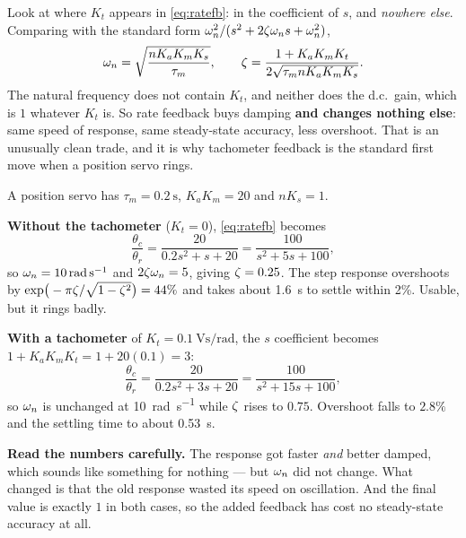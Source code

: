 \documentclass[11pt,a4paper]{article}
\begin{document}
\begin{keyidea}
Look at where $K_{t}$ appears in \eqref{eq:ratefb}: in the coefficient of $s$,
and \emph{nowhere else}. Comparing with the standard form
$\omega_{n}^{2}/(s^{2}+2\zeta\omega_{n} s+\omega_{n}^{2})$,
\[
  \omega_{n}=\sqrt{\frac{nK_{a}K_{m}K_{s}}{\tau_{m}}},
  \qquad
  \zeta=\frac{1+K_{a}K_{m}K_{t}}{2\sqrt{\tau_{m}nK_{a}K_{m}K_{s}}} .
\]
The natural frequency does not contain $K_{t}$, and neither does the d.c.\
gain, which is $1$ whatever $K_{t}$ is. So rate feedback buys damping
\textbf{and changes nothing else}: same speed of response, same steady-state
accuracy, less overshoot. That is an unusually clean trade, and it is why
tachometer feedback is the standard first move when a position servo rings.
\end{keyidea}

\begin{workedex}[breakable, title={Worked example 3.1 --- what rate feedback buys}]
A position servo has $\tau_{m}=\SI{0.2}{\second}$, $K_{a}K_{m}=20$ and
$nK_{s}=1$.

\smallskip
\textbf{Without the tachometer} ($K_{t}=0$), \eqref{eq:ratefb} becomes
\[
  \frac{\theta_{c}}{\theta_{r}}=\frac{20}{0.2s^{2}+s+20}
   =\frac{100}{s^{2}+5s+100},
\]
so $\omega_{n}=\SI{10}{\radian\per\second}$ and $2\zeta\omega_{n}=5$, giving $\zeta=0.25$. The
step response overshoots by
$\exp\!\big(-\pi\zeta/\sqrt{1-\zeta^{2}}\big)=44\%$ and takes about
\SI{1.6}{\second} to settle within 2\%. Usable, but it rings badly.

\smallskip
\textbf{With a tachometer} of $K_{t}=\SI{0.1}{\volt\second\per\radian}$, the
$s$ coefficient becomes $1+K_{a}K_{m}K_{t}=1+20(0.1)=3$:
\[
  \frac{\theta_{c}}{\theta_{r}}=\frac{20}{0.2s^{2}+3s+20}
   =\frac{100}{s^{2}+15s+100},
\]
so $\omega_{n}$ is unchanged at \SI{10}{\radian\per\second} while $\zeta$ rises to
$0.75$. Overshoot falls to $2.8\%$ and the settling time to about
\SI{0.53}{\second}.

\smallskip
\textbf{Read the numbers carefully.} The response got faster \emph{and} better
damped, which sounds like something for nothing --- but $\omega_{n}$ did not change.
What changed is that the old response wasted its speed on oscillation.
And the final value is exactly $1$ in both cases, so the added feedback has
cost no steady-state accuracy at all.
\end{workedex}
\end{document}
